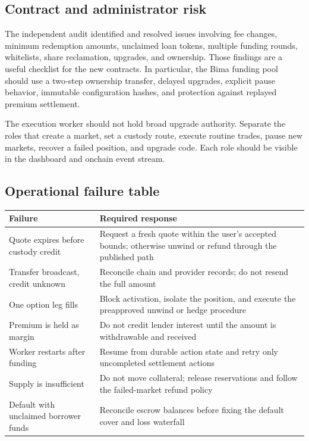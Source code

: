 \documentclass[11pt,oneside]{article}
\begin{document}
\subsection{Contract and administrator risk}

The independent audit identified and resolved issues involving fee changes, minimum redemption amounts, unclaimed loan tokens, multiple funding rounds, whitelists, share reclamation, upgrades, and ownership. Those findings are a useful checklist for the new contracts. In particular, the Bima funding pool should use a two-step ownership transfer, delayed upgrades, explicit pause behavior, immutable configuration hashes, and protection against replayed premium settlement.

The execution worker should not hold broad upgrade authority. Separate the roles that create a market, set a custody route, execute routine trades, pause new markets, recover a failed position, and upgrade code. Each role should be visible in the dashboard and onchain event stream.

\subsection{Operational failure table}

\begin{center}
\begin{tabularx}{\textwidth}{@{}p{}Y@{}}
\toprule
\textbf{Failure} & \textbf{Required response} \\
\midrule
Quote expires before custody credit & Request a fresh quote within the user's accepted bounds; otherwise unwind or refund through the published path \\
Transfer broadcast, credit unknown & Reconcile chain and provider records; do not resend the full amount \\
One option leg fills & Block activation, isolate the position, and execute the preapproved unwind or hedge procedure \\
Premium is held as margin & Do not credit lender interest until the amount is withdrawable and received \\
Worker restarts after funding & Resume from durable action state and retry only uncompleted settlement actions \\
Supply is insufficient & Do not move collateral; release reservations and follow the failed-market refund policy \\
Default with unclaimed borrower funds & Reconcile escrow balances before fixing the default cover and loss waterfall \\
\bottomrule
\end{tabularx}
\end{center}
\end{document}
